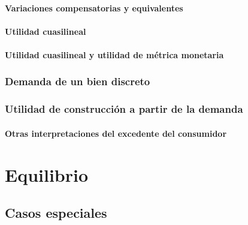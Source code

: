 \documentclass[
]{article}
\begin{document}
\hypertarget{variaciones-compensatorias-y-equivalentes}{%
\paragraph{Variaciones compensatorias y
equivalentes}\label{variaciones-compensatorias-y-equivalentes}}

\hypertarget{utilidad-cuasilineal}{%
\paragraph{Utilidad cuasilineal}\label{utilidad-cuasilineal}}

\hypertarget{utilidad-cuasilineal-y-utilidad-de-muxe9trica-monetaria}{%
\paragraph{Utilidad cuasilineal y utilidad de métrica
monetaria}\label{utilidad-cuasilineal-y-utilidad-de-muxe9trica-monetaria}}

\hypertarget{demanda-de-un-bien-discreto}{%
\subsubsection{Demanda de un bien
discreto}\label{demanda-de-un-bien-discreto}}

\hypertarget{utilidad-de-construcciuxf3n-a-partir-de-la-demanda}{%
\subsubsection{Utilidad de construcción a partir de la
demanda}\label{utilidad-de-construcciuxf3n-a-partir-de-la-demanda}}

\hypertarget{otras-interpretaciones-del-excedente-del-consumidor}{%
\paragraph{Otras interpretaciones del excedente del
consumidor}\label{otras-interpretaciones-del-excedente-del-consumidor}}

\hypertarget{equilibrio}{%
\section{Equilibrio}\label{equilibrio}}

\hypertarget{casos-especiales}{%
\subsection{Casos especiales}\label{casos-especiales}}
\end{document}
